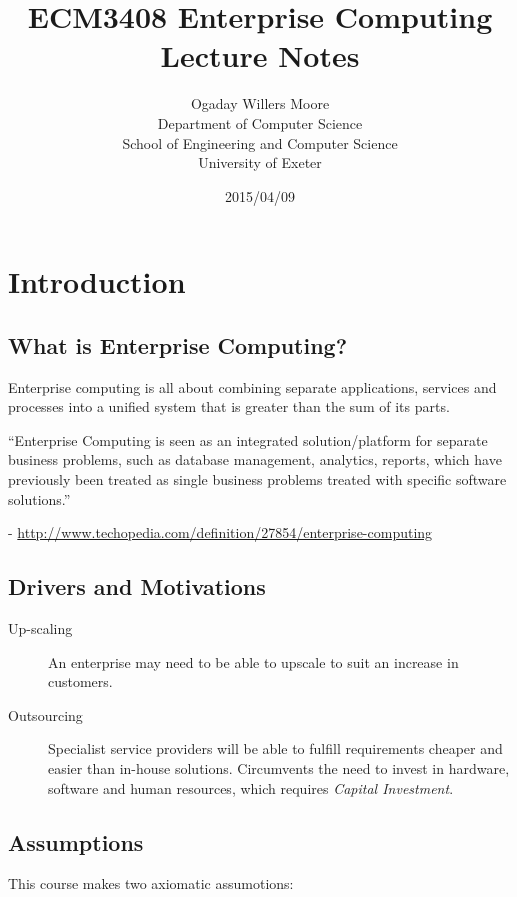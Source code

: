 \documentclass[11pt]{article}
\title{ECM3408 Enterprise Computing Lecture Notes}
\author{Ogaday Willers Moore\\        %
Department of Computer Science\\
School of Engineering and Computer Science\\
University of Exeter}
\date{2015/04/09}
\begin{document}
\maketitle

\tableofcontents

\pagebreak


\section{Introduction}
\label{sec:intro}

\subsection{What is Enterprise Computing?}
Enterprise computing is all about combining separate applications, services and processes into a unified system that is greater than the sum of its parts.
\begin{displayquote}
``Enterprise Computing is seen as an integrated solution/platform for separate business problems, such as database management, analytics, reports, which have previously been treated as single business problems treated with specific software solutions.''
\end{displayquote}

- \url{http://www.techopedia.com/definition/27854/enterprise-computing}

\subsection{Drivers and Motivations}

\begin{description}
\item[Up-scaling] An enterprise may need to be able to upscale to suit an increase in customers.
\item[Outsourcing] Specialist service providers will be able to fulfill requirements cheaper and easier than in-house solutions. Circumvents the need to invest in hardware, software and human resources, which requires \textit{Capital Investment}.
\end{description}

\subsection{Assumptions}

This course makes two axiomatic assumotions:
\end{document}
